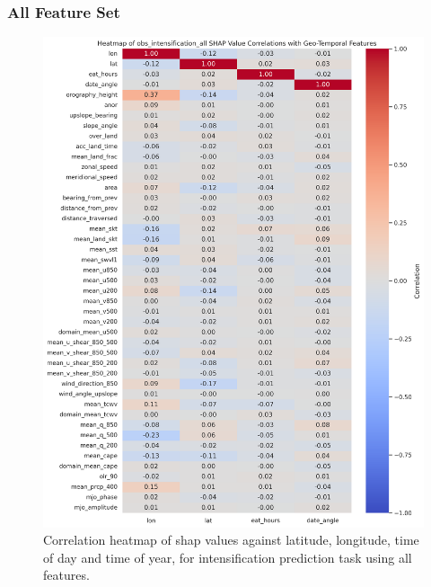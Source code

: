 \subsubsection{All Feature Set}
\begin{figure}[ht]
    \centering
    \includegraphics[width=\textwidth]{../figures/generated/experiments/obs_intensification/obs_intensification_all_shap_correlation_heatmap.png}
    \caption{Correlation heatmap of \acrshort{shap} values against latitude, longitude, time of day and time of year, for intensification prediction task using all features.}
    \label{fig:obs_intensification_all_shap_heatmap}
\end{figure}

